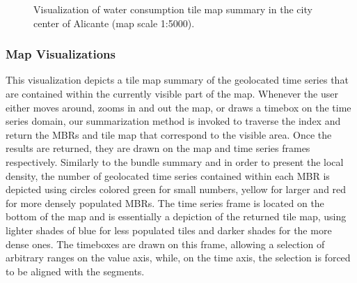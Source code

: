 \begin{figure}[!ht]
 \centering
 \caption{Visualization of water consumption tile map summary in the city center of Alicante (map scale 1:5000).}
 \label{fig:alicante_example2}
\end{figure}

\subsubsection{Map Visualizations}
\label{subsubsec:tilemap_sum_vis}
This visualization depicts a tile map summary of the geolocated time series that are contained within the currently visible part of the map. Whenever the user either moves around, zooms in and out the map, or draws a timebox on the time series domain, our summarization method is invoked to traverse the \hisax index and return the MBRs and tile map that correspond to the visible area. Once the results are returned, they are drawn on the map and time series frames respectively. Similarly to the bundle summary and in order to present the local density, the number of geolocated time series contained within each MBR is depicted using circles colored green for small numbers, yellow for larger and red for more densely populated MBRs. The time series frame is located on the bottom of the map and is essentially a depiction of the returned tile map, using lighter shades of blue for less populated tiles and darker shades for the more dense ones. The timeboxes are drawn on this frame, allowing a selection of arbitrary ranges on the value axis, while, on the time axis, the selection is forced to be aligned with the \isax segments.


